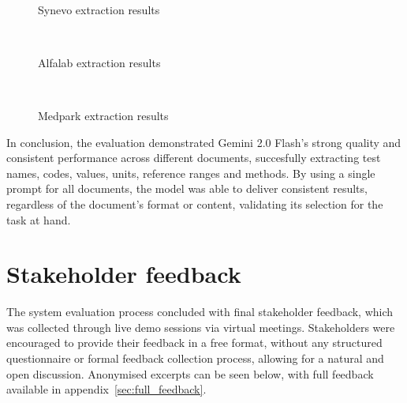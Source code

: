 \begin{figure}[ht]
    \centering
    \\[\baselineskip]
    \caption{Synevo extraction results}\label{fig:synevo}
\end{figure}

\begin{figure}[ht]
    \centering
    \\[\baselineskip]
    \caption{Alfalab extraction results}\label{fig:alfalab}
\end{figure}

\begin{figure}[ht]
    \centering
    \\[\baselineskip]
    \caption{Medpark extraction results}\label{fig:medpark}
\end{figure}

In conclusion, the evaluation demonstrated Gemini 2.0 Flash's strong quality and consistent performance across different documents, succesfully extracting test names, codes, values, units, reference ranges and methods. By using a single prompt for all documents, the model was able to deliver consistent results, regardless of the document's format or content, validating its selection for the task at hand.

\section{Stakeholder feedback}

The system evaluation process concluded with final stakeholder feedback, which was collected through live demo sessions via virtual meetings. Stakeholders were encouraged to provide their feedback in a free format, without any structured questionnaire or formal feedback collection process, allowing for a natural and open discussion. Anonymised excerpts can be seen below, with full feedback available in appendix~\ref{sec:full_feedback}.


